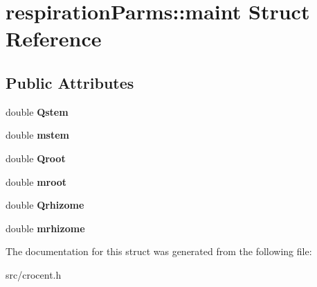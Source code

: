 \hypertarget{structrespiration_parms_1_1maint}{\section{respiration\-Parms\-:\-:maint Struct Reference}
\label{structrespiration_parms_1_1maint}
}
\subsection*{Public Attributes}
\begin{DoxyCompactItemize}
\item 
\hypertarget{structrespiration_parms_1_1maint_a74d9dbf812f78f31284332a326e4279f}{double {\bfseries Qstem}}\label{structrespiration_parms_1_1maint_a74d9dbf812f78f31284332a326e4279f}

\item 
\hypertarget{structrespiration_parms_1_1maint_a75f320a83029bbfbf443c205ed3b1b69}{double {\bfseries mstem}}\label{structrespiration_parms_1_1maint_a75f320a83029bbfbf443c205ed3b1b69}

\item 
\hypertarget{structrespiration_parms_1_1maint_a597f1b15cecd7fc530f053db6fdc90b8}{double {\bfseries Qroot}}\label{structrespiration_parms_1_1maint_a597f1b15cecd7fc530f053db6fdc90b8}

\item 
\hypertarget{structrespiration_parms_1_1maint_af24623923048e45fd3217d3d08fc94cc}{double {\bfseries mroot}}\label{structrespiration_parms_1_1maint_af24623923048e45fd3217d3d08fc94cc}

\item 
\hypertarget{structrespiration_parms_1_1maint_ae7ae6a15b0f561cfc6589ce91c679bfa}{double {\bfseries Qrhizome}}\label{structrespiration_parms_1_1maint_ae7ae6a15b0f561cfc6589ce91c679bfa}

\item 
\hypertarget{structrespiration_parms_1_1maint_acb43b7ff27bd94a4bbcfada857d6cf4b}{double {\bfseries mrhizome}}\label{structrespiration_parms_1_1maint_acb43b7ff27bd94a4bbcfada857d6cf4b}

\end{DoxyCompactItemize}


The documentation for this struct was generated from the following file\-:\begin{DoxyCompactItemize}
\item 
src/crocent.\-h\end{DoxyCompactItemize}
